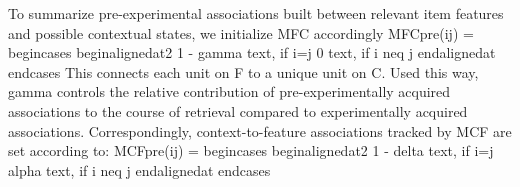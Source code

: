 {}To summarize pre-experimental associations built between relevant item features and possible contextual states, we initialize \markdownRendererDollarSign{}M\markdownRendererCircumflex{}\markdownRendererLeftBrace{}FC\markdownRendererRightBrace{}\markdownRendererDollarSign{} accordingly\markdownRendererInterblockSeparator
{}\markdownRendererDollarSign{}\markdownRendererDollarSign{}M\markdownRendererCircumflex{}\markdownRendererLeftBrace{}FC\markdownRendererRightBrace{}\markdownRendererUnderscore{}\markdownRendererLeftBrace{}pre(ij)\markdownRendererRightBrace{} = \markdownRendererBackslash{}begin\markdownRendererLeftBrace{}cases\markdownRendererRightBrace{} \markdownRendererBackslash{}begin\markdownRendererLeftBrace{}alignedat\markdownRendererRightBrace{}\markdownRendererLeftBrace{}2\markdownRendererRightBrace{} 1 - \markdownRendererBackslash{}gamma \markdownRendererBackslash{}text\markdownRendererLeftBrace{}, if \markdownRendererRightBrace{} i=j \markdownRendererBackslash{} 0 \markdownRendererBackslash{}text\markdownRendererLeftBrace{}, if \markdownRendererRightBrace{} i \markdownRendererBackslash{}neq j\markdownRendererBackslash{} \markdownRendererBackslash{}end\markdownRendererLeftBrace{}alignedat\markdownRendererRightBrace{} \markdownRendererBackslash{}end\markdownRendererLeftBrace{}cases\markdownRendererRightBrace{}\markdownRendererDollarSign{}\markdownRendererDollarSign{}\markdownRendererInterblockSeparator
{}This connects each unit on \markdownRendererDollarSign{}F\markdownRendererDollarSign{} to a unique unit on \markdownRendererDollarSign{}C\markdownRendererDollarSign{}. Used this way, \markdownRendererDollarSign{}\markdownRendererBackslash{}gamma\markdownRendererDollarSign{} controls the relative contribution of pre-experimentally acquired associations to the course of retrieval compared to experimentally acquired associations. Correspondingly, context-to-feature associations tracked by \markdownRendererDollarSign{}M\markdownRendererCircumflex{}\markdownRendererLeftBrace{}CF\markdownRendererRightBrace{}\markdownRendererDollarSign{} are set according to:\markdownRendererInterblockSeparator
{}\markdownRendererDollarSign{}\markdownRendererDollarSign{}M\markdownRendererCircumflex{}\markdownRendererLeftBrace{}CF\markdownRendererRightBrace{}\markdownRendererUnderscore{}\markdownRendererLeftBrace{}pre(ij)\markdownRendererRightBrace{} = \markdownRendererBackslash{}begin\markdownRendererLeftBrace{}cases\markdownRendererRightBrace{} \markdownRendererBackslash{}begin\markdownRendererLeftBrace{}alignedat\markdownRendererRightBrace{}\markdownRendererLeftBrace{}2\markdownRendererRightBrace{} 1 - \markdownRendererBackslash{}delta \markdownRendererBackslash{}text\markdownRendererLeftBrace{}, if \markdownRendererRightBrace{} i=j \markdownRendererBackslash{} \markdownRendererBackslash{}alpha \markdownRendererBackslash{}text\markdownRendererLeftBrace{}, if \markdownRendererRightBrace{} i \markdownRendererBackslash{}neq j\markdownRendererBackslash{} \markdownRendererBackslash{}end\markdownRendererLeftBrace{}alignedat\markdownRendererRightBrace{} \markdownRendererBackslash{}end\markdownRendererLeftBrace{}cases\markdownRendererRightBrace{}\markdownRendererDollarSign{}\markdownRendererDollarSign{}\markdownRendererInterblockSeparator
